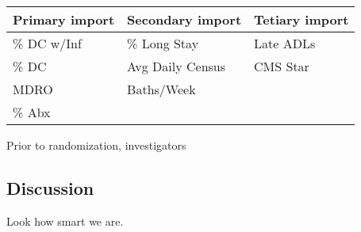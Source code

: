 \documentclass[]{sagej}
\begin{document}
\begin{longtable}[]{@{}lll@{}}
\toprule
Primary import & Secondary import & Tetiary import\tabularnewline
\midrule
\endhead
\% DC w/Inf & \% Long Stay & Late ADLs\tabularnewline
\% DC & Avg Daily Census & CMS Star\tabularnewline
MDRO & Baths/Week\tabularnewline
\% Abx &\tabularnewline
\bottomrule
\end{longtable}

Prior to randomization, investigators

\subsection{Discussion}\label{discussion}

Look how smart we are.


\end{document}
